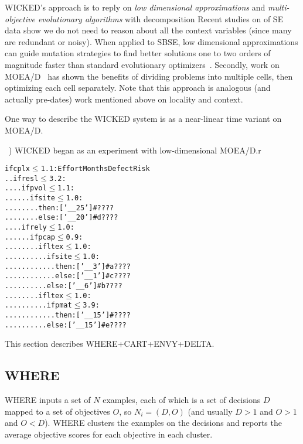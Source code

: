 

WICKED's approach is to reply on {\em low dimensional
  approximations} and 
{\em multi-objective
evolutionary algorithms} with decomposition
Recent studies on 
of SE data show we do not
need to reason about all the context variables
(since many are redundant or noisy). When applied to
SBSE, low dimensional approximations can
guide mutation strategies to find
better solutions one to two orders of magnitude
faster than standard evolutionary
optimizers~\cite{krall14,krall14b}.
Secondly, work on MOEA/D~\cite{zhang07:TEC}
has
shown the benefits of dividing  problems into multiple cells, then 
optimizing each cell separately.  Note
that this approach is analogous (and actually
pre-dates) work mentioned above on locality and context.

One way to describe the WICKED system is as a  near-linear time variant on MOEA/D.


~\cite{zhang07:TEC})
WICKED began as an experiment with low-dimensional MOEA/D.r

{\scriptsize
\begin{alltt}
if cplx \(\le\) 1.1:                          Effort  Months   Defect Risk
.. if resl \(\le\) 3.2:
.. .. if pvol \(\le\) 1.1:
.. .. .. if site \(\le\) 1.0:
.. .. .. ..  then: ['__25']  #                 ?      ?        ?      ?
.. .. .. ..  else: ['__20']  #          d      ?      ?        ?      ?
.. .. if rely \(\le\) 1.0:
.. .. .. if pcap \(\le\) 0.9:
.. .. .. .. if ltex \(\le\) 1.0:
.. .. .. .. .. if site \(\le\) 1.0:
.. .. .. .. .. ..  then: ['__3']  #     a     ?        ?      ?       ?
.. .. .. .. .. ..  else: ['__1']  #     c     ?        ?      ?       ?
.. .. .. .. .. else: ['__6']  #        b      ?        ?      ?       ?
.. .. .. .. if ltex \(\le\) 1.0:
.. .. .. .. .. if pmat \(\le\) 3.9:
.. .. .. .. .. ..  then: ['__15']  #         ?        ?      ?       ?
.. .. .. .. .. else: ['__15']  #       e     ?        ?      ?       ?
\end{alltt}}



This section describes WHERE+CART+ENVY+DELTA.

\subsection{WHERE}
WHERE inputs a set of $N$ examples, each of which is a set of decisions $D$
mapped to a set of objectives  $O$, so $N_i= (D,O)$ (and usually $D>1$ and $O>1$ and 
$O<D$).
WHERE clusters the examples on the decisions and reports the average objective
scores for each objective in each cluster.

